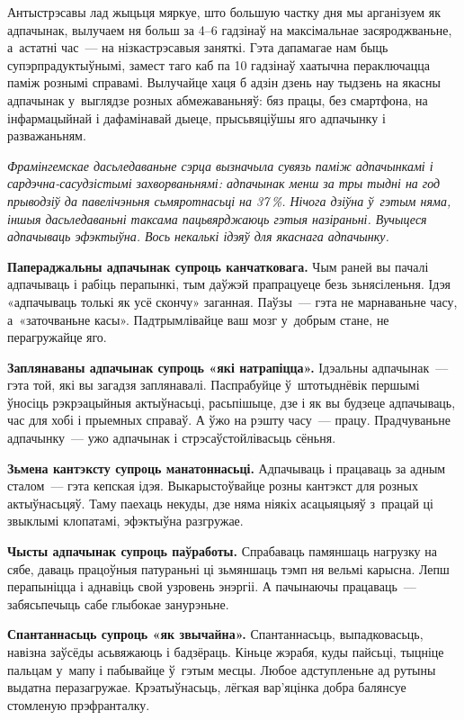 Антыстрэсавы лад жыцьця мяркуе, што большую частку дня мы арганізуем як адпачынак, вылучаем ня больш за 4--6 гадзінаў на максімальнае засяроджваньне, а~астатні час~--- на нізкастрэсавыя заняткі. Гэта дапамагае нам быць супэрпрадуктыўнымі, замест таго каб па 10 гадзінаў хаатычна пераключацца паміж рознымі справамі. Вылучайце хаця б адзін дзень нау тыдзень на якасны адпачынак у~выглядзе розных абмежаваньняў: бяз працы, без смартфона, на інфармацыйнай і дафамінавай дыеце, прысьвяціўшы яго адпачынку і разважаньням.

\emph{Фрамінгемскае дасьледаваньне сэрца вызначыла сувязь паміж адпачынкамі і сардэчна-сасудзістымі захворваньнямі: адпачынак менш за тры тыдні на год прыводзіў да павелічэньня сьмяротнасьці на 37\,\%. Нічога дзіўна ў~гэтым няма, іншыя дасьледаваньні таксама пацьвярджаюць гэтыя назіраньні. Вучыцеся адпачываць эфэктыўна. Вось некалькі ідэяў для якаснага адпачынку.}

\textbf{Папераджальны адпачынак супроць канчатковага.} Чым раней вы пачалі адпачываць і рабіць перапынкі, тым даўжэй прапрацуеце безь зьнясіленьня. Ідэя «адпачываць толькі як усё скончу» заганная. Паўзы~--- гэта не марнаваньне часу, а~«заточваньне касы». Падтрымлівайце ваш мозг у~добрым стане, не перагружайце яго.

\textbf{Заплянаваны адпачынак супроць «які натрапіцца».} Ідэальны адпачынак~--- гэта той, які вы загадзя заплянавалі. Паспрабуйце ў~штотыднёвік першымі ўносіць рэкрэацыйныя актыўнасьці, расьпішыце, дзе і як вы будзеце адпачываць, час для хобі і прыемных справаў. А ўжо на рэшту часу~--- працу. Прадчуваньне адпачынку~--- ужо адпачынак і стрэсаўстойлівасьць сёньня.

\textbf{Зьмена кантэксту супроць манатоннасьці.} Адпачываць і працаваць за адным сталом~--- гэта кепская ідэя. Выкарыстоўвайце розны кантэкст для розных актыўнасьцяў. Таму паехаць некуды, дзе няма ніякіх асацыяцыяў з~працай ці звыклымі клопатамі, эфэктыўна разгружае.

\textbf{Чысты адпачынак супроць паўработы.} Спрабаваць памяншаць нагрузку на сябе, даваць працоўныя патураньні ці зьмяншаць тэмп ня вельмі карысна. Лепш перапыніцца і аднавіць свой узровень энэргіі. А пачынаючы працаваць~--- забясьпечыць сабе глыбокае занурэньне.

\textbf{Спантаннасьць супроць «як звычайна».} Спантаннасьць, выпадковасьць, навізна заўсёды асьвяжаюць і бадзёраць. Кіньце жэрабя, куды пайсьці, тыцніце пальцам у~мапу і пабывайце ў~гэтым месцы. Любое адступленьне ад рутыны выдатна перазагружае. Крэатыўнасьць, лёгкая вар'яцінка добра балянсуе стомленую прэфранталку.

